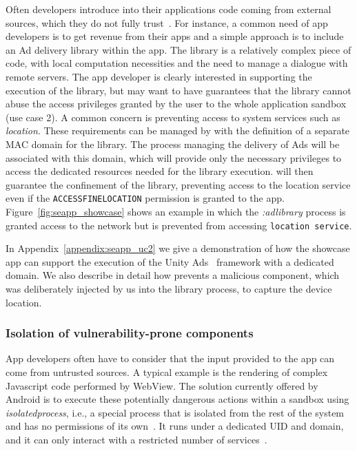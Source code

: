 Often developers introduce into their applications code coming from
external sources, which they do not fully trust~\cite{seapp_7958574,
  seapp_10.1145/2414456.2414498, seapp_demetriou2016free}.  For
instance, a common need of app developers is to get revenue from their
apps and a simple approach is to include an Ad delivery library within
the app.  The library is a relatively complex piece of code, with
local computation necessities and the need to manage a dialogue with
remote servers.  The app developer is clearly interested in supporting
the execution of the library, but may want to have guarantees that the
library cannot abuse the access privileges granted by the user to the
whole application sandbox (use case 2).  A common concern is
preventing access to system services such as {\em location}.  These
requirements can be managed by \seapp with the definition of a separate
MAC domain for the library.  The process managing the delivery of Ads
will be associated with this domain, which will provide only the
necessary privileges to access the dedicated resources needed for the
library execution.  \sel will then guarantee the confinement of the
library, preventing access to the location service even if the
\texttt{ACCESS\textunderscore FINE\textunderscore LOCATION} permission
is granted to the app.  Figure~\ref{fig:seapp_showcase} shows an
example in which the {\em :adlibrary} process is granted access to the
network but is prevented from accessing \texttt{location service}.

In Appendix~\ref{appendix:seapp_uc2} we give a demonstration of how
the showcase app can support the execution of the Unity
Ads~\cite{seapp_unityads} framework with a dedicated \sel domain. We
also describe in detail how \seapp prevents a malicious component, which
was deliberately injected by us into the library process, to capture
the device location.


\subsubsection{Isolation of vulnerability-prone
  components}\label{sect:seapp_int_comp_isolation}

App developers often have to consider that the input provided to the
app can come from untrusted sources.  A typical example is the
rendering of complex Javascript code performed by WebView.  The
solution currently offered by Android is to execute these potentially
dangerous actions within a sandbox using {\em isolatedprocess}, i.e.,
a special process that is isolated from the rest of the system and has
no permissions of its own~\cite{seapp_isolatedprocess_perm}.  It runs
under a dedicated UID and \sel domain, and it can only interact with a
restricted number of services~\cite{seapp_isolated_app_te}.

